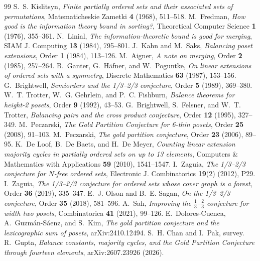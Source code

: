 \documentclass[11pt]{article}
\theoremstyle{definition}
\theoremstyle{remark}
\begin{document}
\begin{thebibliography}{99}
 S.~S. Kislitsyn, \emph{Finite partially ordered sets and their
associated sets of permutations}, Matematicheskie Zametki \textbf{4} (1968), 511--518.
 M.~Fredman, \emph{How good is the information theory bound in sorting?},
Theoretical Computer Science \textbf{1} (1976), 355--361.
 N.~Linial, \emph{The information-theoretic bound is good for merging},
SIAM J. Computing \textbf{13} (1984), 795--801.
 J.~Kahn and M.~Saks, \emph{Balancing poset extensions}, Order
\textbf{1} (1984), 113--126.
 M.~Aigner, \emph{A note on merging}, Order \textbf{2} (1985), 257--264.
 B.~Ganter, G.~H\"afner, and W.~Poguntke, \emph{On linear extensions of
ordered sets with a symmetry}, Discrete Mathematics \textbf{63} (1987), 153--156.
 G.~Brightwell, \emph{Semiorders and the 1/3--2/3 conjecture},
Order \textbf{5} (1989), 369--380.
 W.~T. Trotter, W.~G. Gehrlein, and P.~C. Fishburn, \emph{Balance theorems
for height-2 posets}, Order \textbf{9} (1992), 43--53.
 G.~Brightwell, S.~Felsner, and W.~T. Trotter, \emph{Balancing pairs and the
cross product conjecture}, Order \textbf{12} (1995), 327--349.
 M.~Peczarski, \emph{The Gold Partition Conjecture for 6-thin
posets}, Order \textbf{25} (2008), 91--103.
 M.~Peczarski, \emph{The gold partition conjecture}, Order
\textbf{23} (2006), 89--95. %
 K.~De Loof, B.~De Baets, and H.~De Meyer, \emph{Counting linear
extension majority cycles in partially ordered sets on up to 13 elements}, Computers \&
Mathematics with Applications \textbf{59} (2010), 1541--1547.
 I.~Zaguia, \emph{The 1/3--2/3 conjecture for $N$-free ordered
sets}, Electronic J. Combinatorics \textbf{19}(2) (2012), P29.
 I.~Zaguia, \emph{The 1/3--2/3 conjecture for ordered sets whose
cover graph is a forest}, Order \textbf{36} (2019), 335--347.
 E.~J. Olson and B.~E. Sagan, \emph{On the 1/3--2/3 conjecture},
Order \textbf{35} (2018), 581--596.
 A.~Sah, \emph{Improving the $\frac13$--$\frac23$ conjecture for width two
posets}, Combinatorica \textbf{41} (2021), 99--126.
 E.~Dolores-Cuenca, A.~Guzm\'an-S\'aenz, and S.~Kim, \emph{The
gold partition conjecture and the lexicographic sum of posets}, arXiv:2410.12494.
 S.~H. Chan and I.~Pak, survey. %
 R.~Gupta, \emph{Balance constants, majority cycles, and the Gold
Partition Conjecture through fourteen elements}, arXiv:2607.23926 (2026).
\end{thebibliography}
\end{document}
